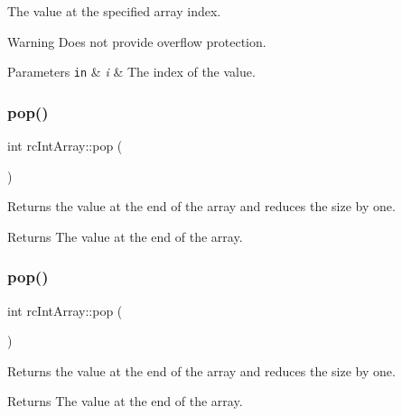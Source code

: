 The value at the specified array index. \begin{DoxyWarning}{Warning}
Does not provide overflow protection. 
\end{DoxyWarning}

\begin{DoxyParams}[1]{Parameters}
\mbox{\tt in}  & {\em i} & The index of the value. \\
\hline
\end{DoxyParams}
\mbox{\label{classrcIntArray_a25558e84868988dc42bf5b2b3c9c3a84}} 
\subsubsection{\texorpdfstring{pop()}{pop()}\hspace{0.1cm}{\footnotesize\ttfamily [1/2]}}
{\footnotesize\ttfamily int rc\+Int\+Array\+::pop (\begin{DoxyParamCaption}{ }\end{DoxyParamCaption})\hspace{0.3cm}{\ttfamily [inline]}}

Returns the value at the end of the array and reduces the size by one. \begin{DoxyReturn}{Returns}
The value at the end of the array. 
\end{DoxyReturn}
\mbox{\label{classrcIntArray_a25558e84868988dc42bf5b2b3c9c3a84}} 
\subsubsection{\texorpdfstring{pop()}{pop()}\hspace{0.1cm}{\footnotesize\ttfamily [2/2]}}
{\footnotesize\ttfamily int rc\+Int\+Array\+::pop (\begin{DoxyParamCaption}{ }\end{DoxyParamCaption})\hspace{0.3cm}{\ttfamily [inline]}}

Returns the value at the end of the array and reduces the size by one. \begin{DoxyReturn}{Returns}
The value at the end of the array. 
\end{DoxyReturn}
\mbox{\label{classrcIntArray_ae52f6cd7ffdd2dba00f6f006853dc441}} 

